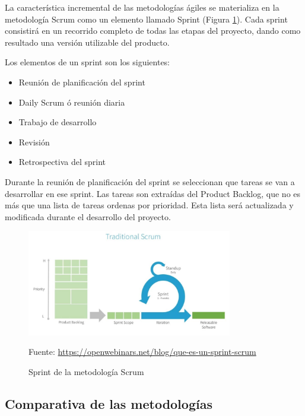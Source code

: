 La característica incremental de las metodologías ágiles se materializa en la metodología Scrum como un elemento llamado Sprint (Figura \ref{fig:sprint_scrum}). Cada sprint consistirá en un recorrido completo de todas las etapas del proyecto, dando como resultado una versión utilizable del producto.

Los elementos de un sprint son los siguientes:

\begin{itemize}
    \item Reunión de planificación del sprint
    \item Daily Scrum ó reunión diaria
    \item Trabajo de desarrollo
    \item Revisión
    \item Retrospectiva del sprint
\end{itemize}

Durante la reunión de planificación del sprint se seleccionan que tareas se van a desarrollar en ese sprint. Las tareas son extraídas del Product Backlog, que no es más que una lista de tareas ordenas por prioridad. Esta lista será actualizada y modificada durante el desarrollo del proyecto.

\begin{figure}[h]
    \centering
    \includegraphics[width=0.8\textwidth]{imagenes/03_Planificacion/sprint_scrum.jpg}
    \begin{center}
        Fuente: \url{https://openwebinars.net/blog/que-es-un-sprint-scrum}
    \end{center}
    \caption{Sprint de la metodología Scrum}
    \label{fig:sprint_scrum}
\end{figure}


\subsection{Comparativa de las metodologías}





